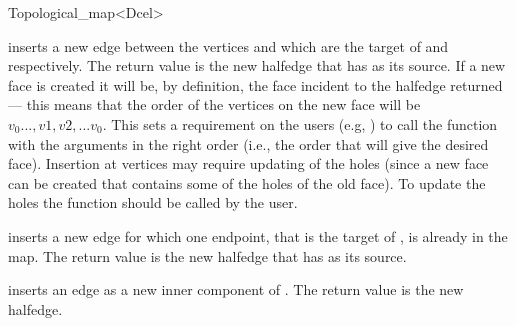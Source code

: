 \begin{ccRefClass}{Topological_map<Dcel>}
\ccQueryFunctions

     {}
     {}
     {}

\ccModifiers

     {inserts a new edge
        between the vertices  and  which are the target
        of  and  respectively. The return value
        is the new halfedge that has  as its source.
        If a new face is created it will be, by definition, the face incident
        to the halfedge returned --- this means that the order of the vertices
        on the new face will be $v_0...,v1,v2,...v_0$.
        This sets a requirement on the users (e.g,
        ) to call the function with the arguments
        in the right order (i.e., the order that will give the desired face).
        Insertion at vertices may require updating of the holes  
        (since a 
        new face can be created that contains some of the holes of the old 
        face). To update the holes the function 
         should be called by the user.
        }

    {inserts a new edge for
             which one endpoint,  that is the target of
             , is already in the map.
             The return value is the new halfedge
             that has  as its source.
             }

     {inserts an edge as a new inner component of
       . The return value is the new halfedge.
       }


\end{ccRefClass}
